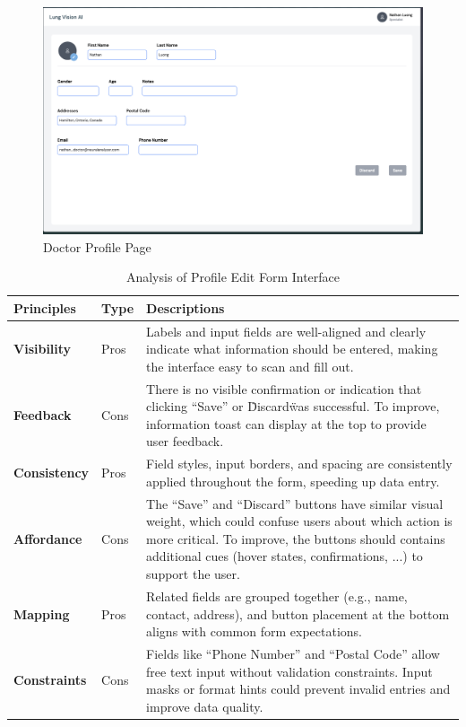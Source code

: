 \documentclass[12pt, titlepage]{article}
\begin{document}
  \begin{figure}[ht!] 
    \centering
    \includegraphics[scale=0.25]{../../assets/doctor_profile.png}
    \caption{Doctor Profile Page}
    \label{fig:doctor_profile_page}
  \end{figure}

\begin{table}[h!]
    \centering
    \begin{tabular}{|p{2.5cm}|p{1.5cm}|p{11cm}|}
    \hline
    \rowcolor{gray!30}
    \textbf{Principles} & \textbf{Type} & \textbf{Descriptions} \\
    \hline
    \textbf{Visibility} & Pros & Labels and input fields are well-aligned and clearly indicate what information should be entered, making the interface easy to scan and fill out. \\
    \hline
    \textbf{Feedback} & Cons & There is no visible confirmation or indication that clicking “Save” or \"Discard\" was successful. To improve, information toast can display at the top to provide user feedback. \\
    \hline
    \textbf{Consistency} & Pros & Field styles, input borders, and spacing are consistently applied throughout the form, speeding up data entry. \\
    \hline
    \textbf{Affordance} & Cons & The “Save” and “Discard” buttons have similar visual weight, which could confuse users about which action is more critical. To improve, the buttons should contains additional cues (hover states, confirmations, ...) to support the user. \\
    \hline
    \textbf{Mapping} & Pros & Related fields are grouped together (e.g., name, contact, address), and button placement at the bottom aligns with common form expectations. \\
    \hline
    \textbf{Constraints} & Cons & Fields like “Phone Number” and “Postal Code” allow free text input without validation constraints. Input masks or format hints could prevent invalid entries and improve data quality. \\
    \hline
    \end{tabular}
    \caption{Analysis of Profile Edit Form Interface}
\end{table}
\end{document}
